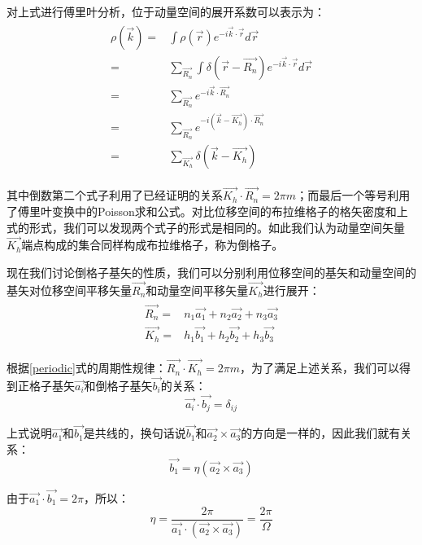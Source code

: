 \documentclass{ctexart}
\begin{document}
    对上式进行傅里叶分析，位于动量空间的展开系数可以表示为：
    \begin{align}
        \begin{split}
            \rho(\Vec{k})=&\int \rho(\Vec{r})e^{-i\Vec{k}\cdot\Vec{r}} d\Vec{r}\\
            =& \sum_{\vec{R_n}}\int \delta(\Vec{r}-\Vec{R_n})e^{-i\Vec{k}\cdot\Vec{r}} d\Vec{r}\\
            =&\sum_{\vec{R_n}} e^{-i\vec{k}\cdot \vec{R_n}}\\
            =&\sum_{\vec{R_n}} e^{-i(\vec{k}-\vec{K_h})\cdot \vec{R_n}}\\
           =&\sum_{\vec{K_h}}\delta(\vec{k}-\vec{K_h})
        \end{split}
    \end{align}
        
        其中倒数第二个式子利用了已经证明的关系$\vec{K_h}\cdot\vec{R_n}=2\pi m$；而最后一个等号利用了傅里叶变换中的Poisson求和公式。对比位移空间的布拉维格子的格矢密度和上式的形式，我们可以发现两个式子的形式是相同的。如此我们认为动量空间矢量$\vec{K_h}$端点构成的集合同样构成布拉维格子，称为倒格子。

        现在我们讨论倒格子基矢的性质，我们可以分别利用位移空间的基矢和动量空间的基矢对位移空间平移矢量$\vec{R_n}$和动量空间平移矢量$\vec{K_h}$进行展开：
        \begin{align}
            \begin{split}
                \vec{R_n}=&n_1\vec{a_1}+n_2\vec{a_2}+n_3\vec{a_3}\\
                \vec{K_h}=&h_1\vec{b_1}+h_2\vec{b_2}+h_3\vec{b_3}
            \end{split}
        \end{align}
        
        根据\eqref{periodic}式的周期性规律：$\vec{R_n}\cdot\vec{K_h}=2\pi m$，为了满足上述关系，我们可以得到正格子基矢$\vec{a_i}$和倒格子基矢$\vec{b_i}$的关系：
        \begin{equation}
            \vec{a_i}\cdot \vec{b_j}=\delta_{ij}
        \end{equation}
        
        上式说明$\vec{a_1}$和$\vec{b_1}$是共线的，换句话说$\vec{b_1}$和$\vec{a_2}\times\vec{a_3}$的方向是一样的，因此我们就有关系：
        \begin{equation}
            \vec{b_1}=\eta(\vec{a_2}\times\vec{a_3})
        \end{equation}
        
        由于$\vec{a_1}\cdot\vec{b_1}=2\pi$，所以：
        \begin{equation}
            \eta=\frac{2\pi}{\vec{a_1}\cdot(\vec{a_2}\times\vec{a_3})}=\frac{2\pi}{\Omega}
        \end{equation}
        
\end{document}
